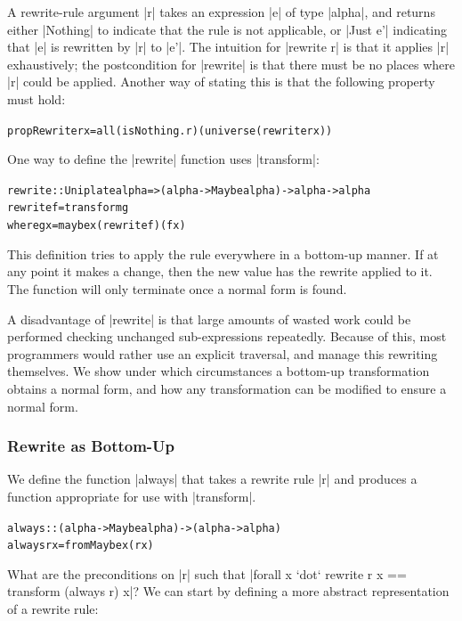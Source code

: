 \documentclass[preprint]{sigplanconf}
\newenvironment{code}{\begin{alltt}\small}{\end{alltt}}
\newcommand{\ignore}{}
\begin{document}
A rewrite-rule argument |r| takes an expression |e| of type |alpha|, and returns either |Nothing| to indicate that the rule is not applicable, or |Just e'| indicating that |e| is rewritten by |r| to |e'|. The intuition for |rewrite r| is that it applies |r| exhaustively; the postcondition for |rewrite| is that there must be no places where |r| could be applied. Another way of stating this is that the following property must hold:

\begin{code}
propRewrite r x = all (isNothing . r) (universe (rewrite r x))
\end{code}

One way to define the |rewrite| function uses |transform|:

\begin{code}
rewrite :: Uniplate alpha => (alpha -> Maybe alpha) -> alpha -> alpha
rewrite f = transform g
    where g x = maybe x (rewrite f) (f x)
\end{code}

This definition tries to apply the rule everywhere in a bottom-up manner. If at any point it makes a change, then the new value has the rewrite applied to it. The function will only terminate once a normal form is found.

A disadvantage of |rewrite| is that large amounts of wasted work could be performed checking unchanged sub-expressions repeatedly. Because of this, most programmers would rather use an explicit traversal, and manage this rewriting themselves. We show under which circumstances a bottom-up transformation obtains a normal form, and how any transformation can be modified to ensure a normal form.

\subsubsection{Rewrite as Bottom-Up}
\label{sec:rewrite_bottom}

We define the function |always| that takes a rewrite rule |r| and produces a function appropriate for use with |transform|.

\begin{code}
always :: (alpha -> Maybe alpha) -> (alpha -> alpha)
always r x = fromMaybe x (r x)
\end{code}

What are the preconditions on |r| such that \ignore|forall x `dot` rewrite r x == transform (always r) x|? We can start by defining a more abstract representation of a rewrite rule:
\end{document}
